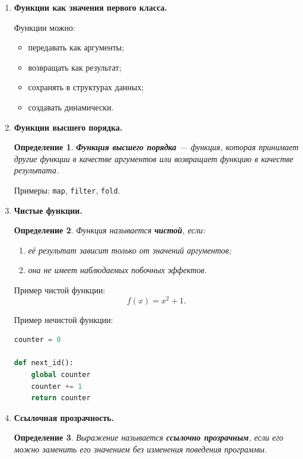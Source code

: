\documentclass[12pt,a4paper]{article}
\newtheorem{definition}{Определение}
\begin{document}
\begin{enumerate}
  \item \textbf{Функции как значения первого класса.}

  Функции можно:
  \begin{itemize}
    \item передавать как аргументы;
    \item возвращать как результат;
    \item сохранять в структурах данных;
    \item создавать динамически.
  \end{itemize}

  \item \textbf{Функции высшего порядка.}

  \begin{definition}
  \textbf{Функция высшего порядка} --- функция, которая принимает другие функции в качестве аргументов или возвращает функцию в качестве результата.
  \end{definition}

  Примеры: \texttt{map}, \texttt{filter}, \texttt{fold}.

  \item \textbf{Чистые функции.}

  \begin{definition}
  Функция называется \textbf{чистой}, если:
  \begin{enumerate}
    \item её результат зависит только от значений аргументов;
    \item она не имеет наблюдаемых побочных эффектов.
  \end{enumerate}
  \end{definition}

  Пример чистой функции:
  \[
  f(x) = x^2 + 1.
  \]

  Пример нечистой функции:
  \begin{lstlisting}[language=Python]
counter = 0

def next_id():
    global counter
    counter += 1
    return counter
  \end{lstlisting}

  \item \textbf{Ссылочная прозрачность.}

  \begin{definition}
  Выражение называется \textbf{ссылочно прозрачным}, если его можно заменить его значением без изменения поведения программы.
  \end{definition}


\end{enumerate}
\end{document}
